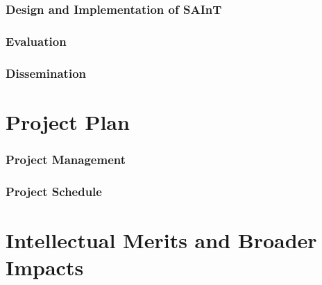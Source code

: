 \section{Design and Implementation of SAInT}
\label{sec:proposed:design}


%

%

\section{Evaluation}
\label{sec:proposed:evaluation}


\section{Dissemination}
\label{sec:proposed:dissemination}


\part{Project Plan}
\label{sec:plan}


\section{Project Management}
\label{sec:mgmt}


\section{Project Schedule}
\label{sec:sched}


\part{Intellectual Merits and Broader Impacts}
\label{sec:IMBI}
